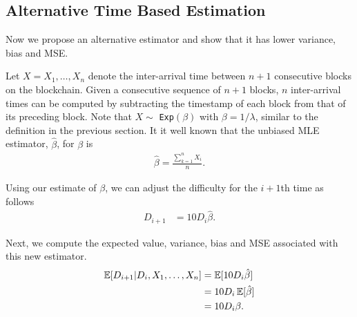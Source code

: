 \subsection{Alternative Time Based Estimation}\label{sec:time based}
Now we propose an alternative estimator and show that it has lower variance, bias and MSE.


 Let $X = X_1, \ldots, X_n$ denote the inter-arrival time between $n+1$ consecutive blocks on the blockchain. Given a consecutive sequence of $n+1$ blocks, $n$ inter-arrival times can be computed by subtracting the timestamp of each block from that of its preceding block. Note that $X \sim$ \texttt{Exp}$(\beta)$ with $\beta = 1/\lambda$, similar to the definition in the previous section. It it well known that the unbiased MLE estimator, $\hat{\beta}$, for $\beta$ is
\begin{align}
\hat{\beta} = \frac{\sum_{k=1}^{n} X_i}{n}. \label{eq:beta-hat}
\end{align}

Using our estimate of $\beta$, we can adjust the difficulty for the $i+1$th time as follows 
\begin{align}
D_{i+1} &= 10 D_i \hat{\beta}.
\end{align}

\noindent Next, we compute the expected value, variance, bias and MSE associated with this new estimator. \\
\begin{align}
\operatorname{\mathbb{E}}[D_{i+1} | D_{i}, X_1, \dots, X_{n}] &= \operatorname{\mathbb{E}}[10 D_i \hat{\beta}] \\
&= 10 D_i \operatorname{\mathbb{E}}[\hat{\beta}] \\
&= 10 D_i\beta.
\end{align}

